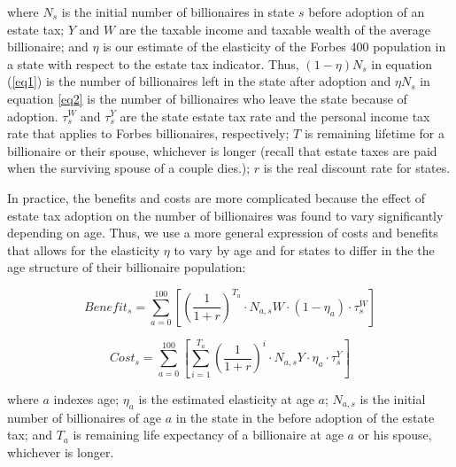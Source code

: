 \documentclass[12pt]{article}
\begin{document}
\noindent where $N_{s}$ is the initial number of billionaires in state $s$ before adoption of an estate tax; $Y$ and $W$ are the taxable income and taxable wealth of the average billionaire;  and $\eta$ is our estimate of the elasticity of the Forbes 400 population in a state with respect to the estate tax indicator. Thus,  $(1 - \eta)N_{s}$ in equation (\ref{eq1}) is the number of billionaires left in the state after adoption and  $\eta N_{s}$ in equation \ref{eq2} is the number of billionaires who leave the state because of adoption.   
$\tau_s^{W}$ and 
$\tau_s^{Y}$ are the state estate tax rate and the personal income tax rate that applies to Forbes billionaires, respectively; $T$ is remaining lifetime for a billionaire or their spouse, whichever is longer (recall that estate taxes are paid when the surviving spouse of a couple dies.);  $r$ is the real discount rate for states.

In practice, the benefits and costs are more complicated because  the effect of estate tax adoption on the number of billionaires was found to vary significantly depending on age. Thus,   we use a more general expression of costs and benefits that allows for the elasticity $\eta$ to vary by age and for states to differ in the the age structure of their billionaire population: 


\begin{equation}
\label{eq3}
     Benefit_s = \sum_{a=0}^{100} \left[ (\frac{1}{1+r})^{T_a} \cdot N_{a,s}W \cdot (1 - \eta_a) \cdot \tau_s^{W}  \right] 
\end{equation}

\begin{equation}
\label{eq4}
     Cost_s = \sum_{a=0}^{100} \left[ \sum_{i=1}^{T_a}(\frac{1}{1+r})^{i} \cdot N_{a,s}Y \cdot \eta_a \cdot \tau_s^{Y}  \right] 
\end{equation}

\noindent where $a$ indexes age;  $\eta_a$ is the estimated elasticity at age $a$;  
$N_{a,s}$ is the initial number of billionaires of age $a$ in the state in the before adoption of the estate tax;   and   $T_a$  is remaining life expectancy of a billionaire at age $a$ or his spouse, whichever is longer.
\end{document}
